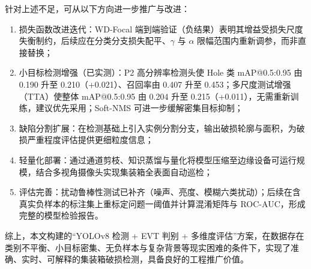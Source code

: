 针对上述不足，可从以下方向进一步推广与改进：

\begin{enumerate}[leftmargin=2.2em,itemsep=2pt]
  \item {\heiti 损失函数改进迭代：}WD-Focal 端到端验证（负结果）表明其增益受损失尺度失衡制约，后续应在分类分支损失配平、$\gamma$ 与 $\alpha$ 限幅范围内重新调参，而非直接替换；
  \item {\heiti 小目标检测增强（已实测）：}P2 高分辨率检测头使 Hole 类 mAP@0.5:0.95 由 0.190 升至 0.210（+0.021）、召回率由 0.407 升至 0.453；多尺度测试增强（TTA）使整体 mAP@0.5:0.95 由 0.204 升至 0.215（+0.011），无需重新训练，建议优先采用；Soft-NMS 可进一步缓解密集目标抑制；
  \item {\heiti 缺陷分割扩展：}在检测基础上引入实例分割分支，输出破损轮廓与面积，为破损严重程度评估提供更细粒度信息；
  \item {\heiti 轻量化部署：}通过通道剪枝、知识蒸馏与量化将模型压缩至边缘设备可运行规模，结合多视角摄像头实现集装箱全表面自动巡检；
  \item {\heiti 评估完善：}扰动鲁棒性测试已补齐（噪声、亮度、模糊六类扰动）；后续在含真实负样本的标注集上重标定问题一阈值并计算混淆矩阵与 ROC-AUC，形成完整的模型检验报告。
\end{enumerate}

综上，本文构建的“YOLOv8 检测 + EVT 判别 + 多维度评估”方案，在数据存在类别不平衡、小目标密集、无负样本与复杂背景等现实困难的条件下，实现了准确、实时、可解释的集装箱破损检测，具备良好的工程推广价值。
